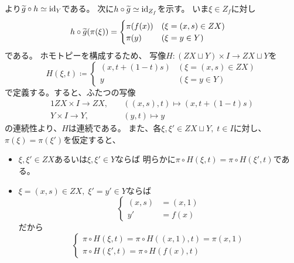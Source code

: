 \documentclass[report]{jlreq}
\begin{document}
\begin{answer}
    より$\widetilde{g} \circ h \simeq \mathrm{id}_Y$である。
    次に$h \circ \widetilde{g} \simeq \mathrm{id}_{Z_f}$を示す。
    いま$\xi \in Z_f$に対し
    \begin{alignat}{1}
        h \circ \widetilde{g}(\pi(\xi))
            &= \begin{cases}
                \pi(f(x)) & (\xi = (x, s) \in ZX) \\
                \pi(y) & (\xi = y \in Y)
            \end{cases}
    \end{alignat}
    である。
    ホモトピーを構成するため、
    写像$H \colon (ZX \sqcup Y) \times I \to ZX \sqcup Y$を
    \begin{equation}
        H(\xi, t) \coloneqq \begin{cases}
            (x, t + (1 - t) s) & (\xi = (x, s) \in ZX) \\
            y & (\xi = y \in Y)
        \end{cases}
    \end{equation}
    で定義する。すると、ふたつの写像
    \begin{alignat}{1}
        ZX \times I \to ZX, &\quad ((x, s), t) \mapsto (x, t + (1 - t) s) \\
        Y \times I \to Y, &\quad (y, t) \mapsto y
    \end{alignat}
    の連続性より、$H$は連続である。
    また、各$\xi, \xi' \in ZX \sqcup Y,\; t \in I$に対し、
    $\pi(\xi) = \pi(\xi')$を仮定すると、
    \begin{itemize}
        \item $\xi, \xi' \in ZX$あるいは$\xi, \xi' \in Y$ならば
            明らかに$\pi \circ H(\xi, t) = \pi \circ H(\xi', t)$である。
        \item $\xi = (x, s) \in ZX,\; \xi' = y' \in Y$ならば
            \begin{equation}
                \begin{cases}
                    (x, s) &= (x, 1) \\
                    y' &= f(x)
                \end{cases}
            \end{equation}
            だから
            \begin{equation}
                \begin{cases}
                    \pi \circ H(\xi, t)
                        = \pi \circ H((x, 1), t)
                        = \pi(x, 1) \\
                    \pi \circ H(\xi', t)
                        = \pi \circ H(f(x), t)

\end{cases}
\end{equation}
\end{itemize}
\end{answer}
\end{document}
